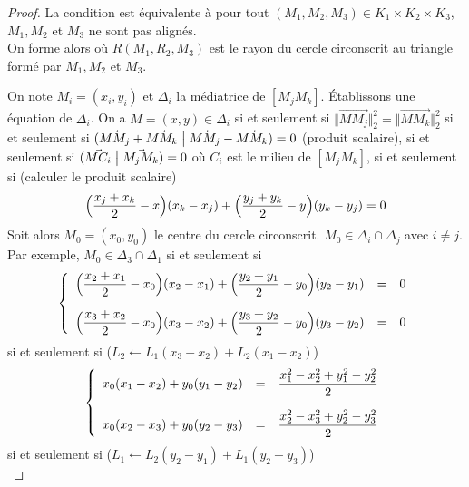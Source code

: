 \begin{proof}
	La condition est équivalente à pour tout $(M_{1},M_{2},M_{3})\in K_{1}\times K_{2}\times K_{3}$, $M_{1},M_{2}$ et $M_{3}$ ne sont pas alignés.\\
	On forme alors 
	où $R(M_{1},R_{2},M_{3})$ est le rayon du cercle circonscrit au triangle formé par $M_{1},M_{2}$ et $M_{3}$.

	On note $M_{i}=(x_{i},y_{i})$ et $\Delta_{i}$ la médiatrice de $[M_{j}M_{k}]$. Établissons une équation de $\Delta_{i}$. On a $M=(x,y)\in\Delta_{i}$ si et seulement si $\Vert \vec{MM_{j}}\Vert_{2}^{2}=\Vert\vec{MM_{k}}\Vert_{2}^{2}$ si et seulement si $(\vec{MM_{j}}+\vec{MM_{k}}\bigm|\vec{MM_{j}}-\vec{MM_{k}})=0$ (produit scalaire), si et seulement si $(\vec{MC_{i}}\bigm|\vec{M_{j}M_{k}})=0$ où $C_{i}$ est le milieu de $[M_{j}M_{k}]$, si et seulement si (calculer le produit scalaire)
	\begin{equation}\Bigl(\frac{x_{j}+x_{k}}{2}-x\Bigr)(x_{k}-x_{j})+\Bigl(\frac{y_{j}+y_{k}}{2}-y\Bigr)(y_{k}-y_{j})=0\end{equation}
	Soit alors $M_{0}=(x_{0},y_{0})$ le centre du cercle circonscrit. $M_{0}\in\Delta_{i}\cap\Delta_{j}$ avec $i\neq j$. Par exemple, $M_{0}\in\Delta_{3}\cap\Delta_{1}$ si et seulement si
	\begin{equation}
	\left\{
		\begin{array}[]{rcl}
			\Bigl(\dfrac{x_{2}+x_{1}}{2}-x_{0}\Bigr)(x_{2}-x_{1})+\Bigl(\dfrac{y_{2}+y_{1}}{2}-y_{0}\Bigr)(y_{2}-y_{1}) &= &0\\[0.5cm]
			\Bigl(\dfrac{x_{3}+x_{2}}{2}-x_{0}\Bigr)(x_{3}-x_{2})+\Bigl(\dfrac{y_{3}+y_{2}}{2}-y_{0}\Bigr)(y_{3}-y_{2}) &= &0
		\end{array}	
	\right.
	\end{equation}
	si et seulement si ($L_{2}\leftarrow L_{1}(x_{3}-x_{2})+L_{2}(x_{1}-x_{2})$)
	\begin{equation}
	\left\{
		\begin{array}[]{rcl}
			x_{0}(x_{1}-x_{2})+y_{0}(y_{1}-y_{2})&=&\dfrac{x_{1}^{2}-x_{2}^{2}+y_{1}^{2}-y_{2}^{2}}{2}\\[0.5cm]
			x_{0}(x_{2}-x_{3})+y_{0}(y_{2}-y_{3})&=&\dfrac{x_{2}^{2}-x_{3}^{2}+y_{2}^{2}-y_{3}^{2}}{2}
		\end{array}	
	\right.
	\end{equation}
	si et seulement si ($L_{1}\leftarrow L_{2}(y_{2}-y_{1})+L_{1}(y_{2}-y_{3})$)
	\begin{equation}

\end{equation}
\end{proof}
